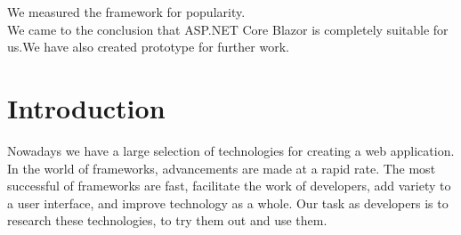 \documentclass{scrartcl}
\begin{document}
We measured the framework for popularity.\\

We came to the conclusion that ASP.NET Core Blazor is completely suitable for us.We have also created prototype for further work.


\setcounter{secnumdepth}{2}



\section{Introduction}

Nowadays we have a large selection of technologies for creating a web application. In the world of frameworks, advancements are made at a rapid rate. The most successful of frameworks are fast, facilitate the work of developers, add variety to a user interface, and improve technology as a whole. Our task as developers is to research these technologies, to try them out and use them.\\
\end{document}
